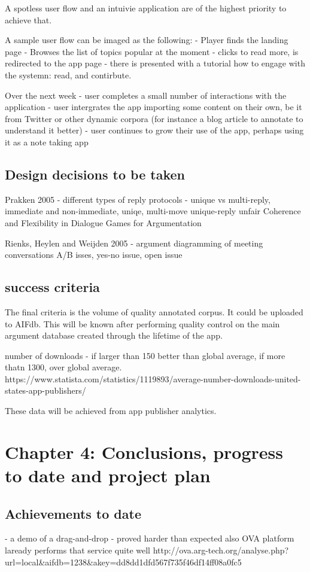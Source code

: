 \documentclass{article}
\begin{document}
A spotless user flow and an intuivie application are of the highest priority to achieve that.

A sample user flow can be imaged as the following:
- Player finds the landing page
- Browses the list of topics popular at the moment
- clicks to read more, is redirected to the app page
- there is presented with a tutorial how to engage with the systemn: read, and contirbute.

Over the next week
- user completes a small number of interactions with the application
- user intergrates the app importing some content on their own, be it from Twitter or other dynamic corpora (for instance a blog article to annotate to understand it better)
- user continues to grow their use of the app, perhaps using it as a note taking app


\subsection{Design decisions to be taken}
Prakken 2005 - different types of reply protocols - unique vs multi-reply, immediate and non-immediate, uniqe, multi-move
unique-reply unfair
Coherence and Flexibility in Dialogue Games for Argumentation 

Rienks, Heylen and Weijden 2005 - argument diagramming of meeting conversations
A/B isses, yes-no issue, open issue

\subsection{success criteria}
The final criteria is the volume of quality annotated corpus. It could be uploaded to AIFdb. 
This will be known after performing quality control on the main argument database created through the lifetime of the app. 

number of downloads - if larger than 150 better than global average, if more thatn 1300, over global average.
https://www.statista.com/statistics/1119893/average-number-downloads-united-states-app-publishers/

These data will be achieved from app publisher analytics.


\section{Chapter 4: Conclusions, progress to date and project plan}
\subsection{Achievements to date}
- a demo of a drag-and-drop - proved harder than expected
also OVA platform laready performs that service quite well
http://ova.arg-tech.org/analyse.php?url=local&aifdb=1238&akey=dd8dd1dfd567f735f46df14ff08a0fc5
\end{document}
